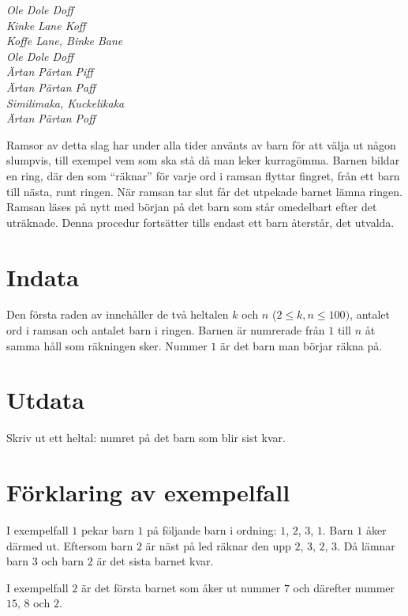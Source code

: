 

{\em
Ole Dole Doff\\ 
Kinke Lane Koff\\ 
Koffe Lane, Binke Bane\\ 
Ole Dole Doff \\
Ärtan Pärtan Piff\\
Ärtan Pärtan Paff \\
Similimaka, Kuckelikaka\\ 
Ärtan Pärtan Poff
}

Ramsor av detta slag har under alla tider använts av barn för att välja ut någon slumpvis, till
exempel vem som ska stå då man leker kurragömma. Barnen bildar en ring, där den som ``räknar''
för varje ord i ramsan flyttar fingret, från ett barn till nästa, runt ringen. När ramsan
tar slut får det utpekade barnet lämna ringen. Ramsan läses på nytt med början på det barn som
står omedelbart efter det uträknade. Denna procedur fortsätter tills endast ett barn återstår, det utvalda.

\section*{Indata}
Den första raden av innehåller de två heltalen $k$ och $n$ ($2 \leq k,n \leq 100)$, antalet ord
i ramsan och antalet barn i ringen. Barnen är numrerade från $1$ till $n$ åt samma håll som räkningen
sker. Nummer $1$ är det barn man börjar räkna på.

\section*{Utdata}
Skriv ut ett heltal: numret på det barn som blir sist kvar.

\section*{Förklaring av exempelfall}
I exempelfall $1$ pekar barn $1$ på följande barn i ordning: $1$, $2$, $3$, $1$. Barn $1$ åker därmed ut.
Eftersom barn $2$ är näst på led räknar den upp $2$, $3$, $2$, $3$. Då lämnar barn $3$ och barn $2$ är
det sista barnet kvar.

I exempelfall $2$ är det första barnet som åker ut nummer $7$ och därefter nummer $15$, $8$ och $2$.
